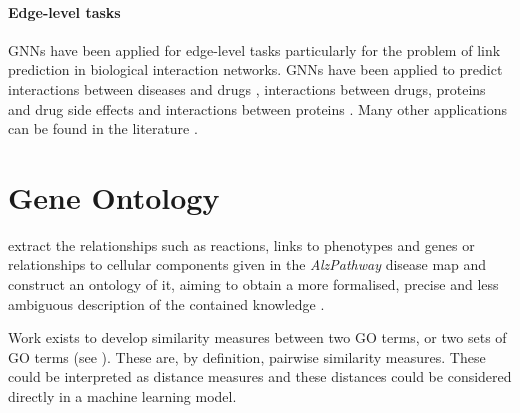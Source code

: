 \documentclass[
	fontsize=10pt, %
	twoside=false, %
	secnumdepth=1, %
  toc=indentunnumbered %
]{kaobook}
\begin{document}






\paragraph{Edge-level tasks} GNNs have been applied for edge-level tasks
particularly for the problem of link prediction in biological interaction
networks. GNNs have been applied to predict interactions between diseases and
drugs \cite{bajaj_GraphConvolutionalNetworks_2017}, interactions between drugs,
proteins and drug side effects \cite{zitnik_modeling_2018} and interactions
between proteins \cite{chereda_ExplainingDecisionsGraph_2021}. Many other
applications can be found in the literature
\cite{zhang_GraphNeuralNetworks_2021}.





\section{Gene Ontology}



\citeauthor{henry_ConvertingDiseaseMaps_2021} extract the relationships such as
reactions, links to phenotypes and genes or relationships to cellular components
given in the \textit{AlzPathway} disease map and construct an ontology of it,
aiming to obtain a more formalised, precise and less ambiguous description of
the contained knowledge \cite{henry_ConvertingDiseaseMaps_2021}.


Work exists to develop similarity measures
between two GO terms, or two sets of GO terms (see ).
These are, by definition, pairwise similarity measures. These
could be interpreted as distance measures and these distances could be
considered directly in a machine learning model.
\end{document}
